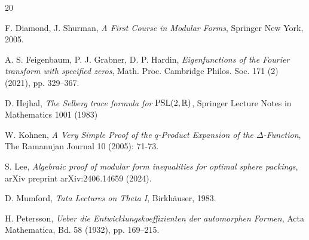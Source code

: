 \begin{thebibliography}{20}




 {\sc F. Diamond, J. Shurman}, \emph{A First Course in Modular Forms}, Springer New York, 2005.

 {\sc A. S. Feigenbaum, P. J. Grabner, D. P. Hardin}, \emph{Eigenfunctions of the Fourier transform with specified zeros}, Math. Proc. Cambridge Philos. Soc. 171 (2) (2021), pp. 329--367.



 {\sc D. Hejhal}, {\em The Selberg trace formula for $\mathrm{PSL}(2, \mathbb{R})$},  Springer Lecture Notes in Mathematics 1001 (1983)


 {\sc W. Kohnen}, {\em A Very Simple Proof of the $q$-Product Expansion of the $\Delta$-Function}, The Ramanujan Journal 10 (2005): 71-73.

 {\sc S. Lee}, {\em Algebraic proof of modular form inequalities for optimal sphere packings}, arXiv preprint arXiv:2406.14659 (2024).

 {\sc D. Mumford}, {\em Tata Lectures on Theta I}, Birkh\"auser, 1983.



 {\sc H. Petersson}, {\em Ueber die Entwicklungskoeffizienten der automorphen Formen}, Acta Mathematica, Bd. 58 (1932),  pp. 169--215.


\end{thebibliography}
